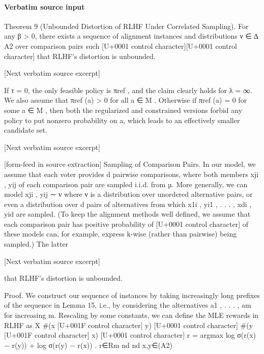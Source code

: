 \documentclass[10pt]{article}
\begin{document}
\paragraph{Verbatim source input}
\begin{ReviewVerbatim}
Theorem 9 (Unbounded Distortion of RLHF Under Correlated Sampling).             For any β > 0, there
exists a sequence of alignment instances and distributions ν ∈ ∆ A2 over comparison pairs such
                                                                       [U+0001 control character][U+0001 control character]
that RLHF’s distortion is unbounded.

[Next verbatim source excerpt]

      If τ = 0, the only feasible policy is πref , and the claim clearly holds for λ = ∞. We also assume that
πref (a) > 0 for all a ∈ M . Otherwise if πref (a) = 0 for some a ∈ M , then both the regularized and constrained
versions forbid any policy to put nonzero probability on a, which leads to an effectively smaller candidate set.

[Next verbatim source excerpt]


[form-feed in source extraction]
Sampling of Comparison Pairs. In our model, we assume that each voter provides d pairwise
comparisons, where both members xji , yij of each comparison pair are sampled i.i.d. from µ. More
generally, we can model {xji , yij } ∼ ν where ν is a distribution over unordered alternative pairs, or
even a distribution over d pairs of alternatives from which {x1i , yi1 , . . . , xdi , yid } are sampled. (To keep
the alignment methods well defined, we assume that each comparison pair has positive probability of
                         [U+0001 control character] of these models can, for example, express k-wise (rather than pairwise)
being sampled.) The latter

[Next verbatim source excerpt]

that RLHF’s distortion is unbounded.

Proof. We construct our sequence of instances by taking increasingly long prefixes of the sequence
in Lemma 15, i.e., by considering the alternatives a1 , . . . , am for increasing m. Rescaling by some
constants, we can define the MLE rewards in RLHF as
                    X #(x [U+001F control character] y)                                 [U+0001 control character] #(y [U+001F control character] x)                         [U+0001 control character]
    r = argmax                       log σ(r(x) − r(y)) +                      log σ(r(y) − r(x)) .
          r∈Rm                nd                                       nd
                {x,y}∈(A2)



\end{ReviewVerbatim}
\end{document}
